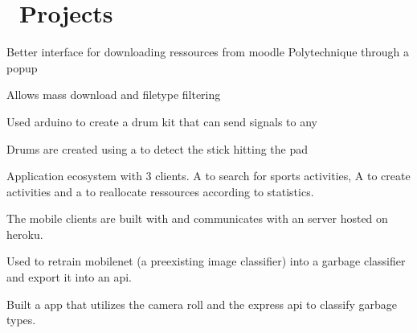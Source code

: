 \section{\faFlask \ Projects}

\begin{tightemize}
\item Better interface for downloading ressources from moodle Polytechnique through a  popup
\item Allows mass download and filetype filtering
\end{tightemize}

\sectionsep

\begin{tightemize}
\item Used arduino to create a drum kit that can send  signals to any 
\item Drums are created using a  to detect the stick hitting the pad 
\end{tightemize}

\sectionsep

\begin{tightemize}
\item Application ecosystem with 3 clients. A  to search for sports activities, A  to create activities and a  to reallocate ressources according to statistics.
\item The mobile clients are built with  and communicates with an  server hosted on heroku.
\end{tightemize}

\sectionsep

\begin{tightemize}
\item Used  to retrain mobilenet (a preexisting image classifier) into a garbage classifier and export it into an  api.
\item Built a  app that utilizes the camera roll and the express api to classify garbage types.
\end{tightemize}

